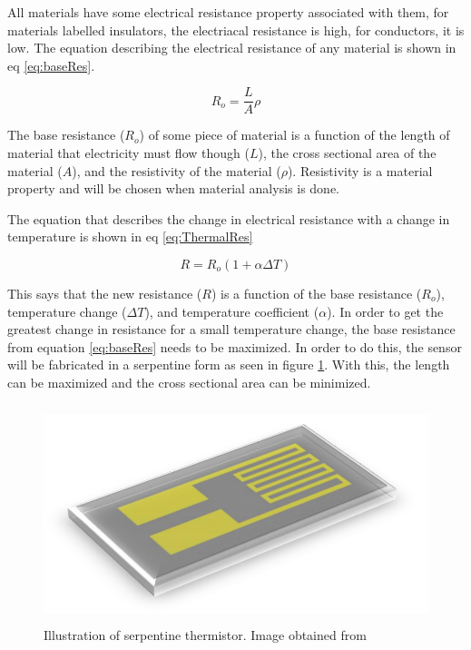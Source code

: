 \documentclass[12pt,a4paper]{report}
\begin{document}
All materials have some electrical resistance property associated with them, for materials labelled insulators, the electriacal resistance is high, for conductors, it is low. The equation describing the electrical resistance of any material is shown in eq \ref{eq:baseRes}.

\begin{equation}\label{eq:baseRes}
    R_o = \frac{L}{A}\rho
\end{equation}

The base resistance ($R_o$) of some piece of material is a function of the length of material that electricity must flow though ($L$), the cross sectional area of the material ($A$), and the resistivity of the material ($\rho$). Resistivity is a material property and will be chosen when material analysis is done.\par

The equation that describes the change in electrical resistance with a change in temperature is shown in eq \ref{eq:ThermalRes}

\begin{equation}\label{eq:ThermalRes}
    R = R_o(1+\alpha \Delta T)
\end{equation}

This says that the new resistance ($R$) is a function of the base resistance ($R_o$), temperature change ($\Delta T$), and temperature coefficient ($\alpha$). In order to get the greatest change in resistance for a small temperature change, the base resistance from equation \ref{eq:baseRes} needs to be maximized. In order to do this, the sensor will be fabricated in a serpentine form as seen in figure \ref{fig:serpentine}. With this, the length can be maximized and the cross sectional area can be minimized.

\begin{figure}[h!]
    \centering
    \includegraphics[height = 2.5in]{Images/serpantine.PNG}
    \caption{Illustration of serpentine thermistor. Image obtained from \cite{Sensors2018}}
    \label{fig:serpentine}
\end{figure}
\end{document}
